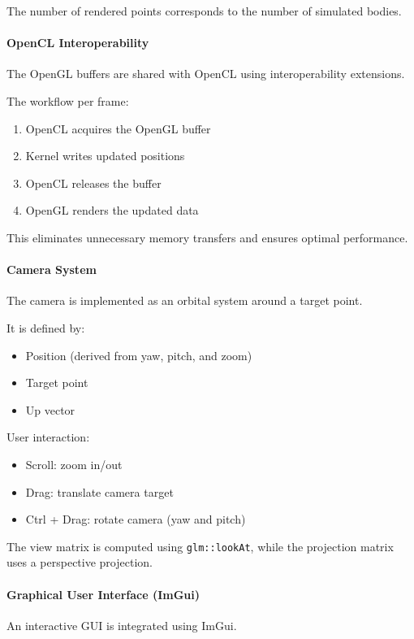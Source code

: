 \documentclass[12pt]{article}
\begin{document}
The number of rendered points corresponds to the number of simulated bodies.

\paragraph{OpenCL Interoperability}

The OpenGL buffers are shared with OpenCL using interoperability extensions.

The workflow per frame:
\begin{enumerate}
\item OpenCL acquires the OpenGL buffer
\item Kernel writes updated positions
\item OpenCL releases the buffer
\item OpenGL renders the updated data
\end{enumerate}

This eliminates unnecessary memory transfers and ensures optimal performance.

\paragraph{Camera System}

The camera is implemented as an orbital system around a target point.

It is defined by:
\begin{itemize}
\item Position (derived from yaw, pitch, and zoom)
\item Target point
\item Up vector
\end{itemize}

User interaction:
\begin{itemize}
\item Scroll: zoom in/out
\item Drag: translate camera target
\item Ctrl + Drag: rotate camera (yaw and pitch)
\end{itemize}

The view matrix is computed using \texttt{glm::lookAt}, while the projection matrix uses a perspective projection.

\paragraph{Graphical User Interface (ImGui)}

An interactive GUI is integrated using ImGui.
\end{document}
